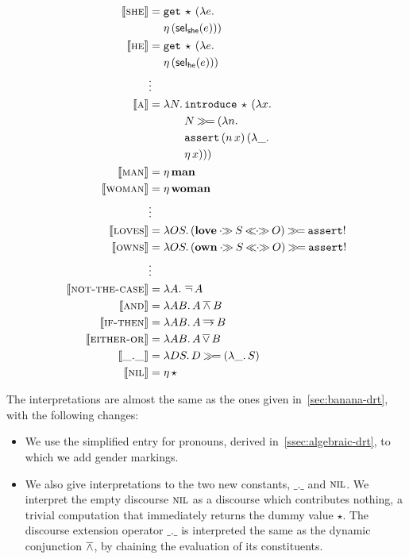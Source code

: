 \begin{align*}
  \lex{she}{\begin{aligned}[t]
      &\app{\op{get}}{\star}{(\lam{e}{ \\
      &\etaE{(\selshe(e))}})}
    \end{aligned}} \\
  \lex{he}{\begin{aligned}[t]
      &\app{\op{get}}{\star}{(\lam{e}{ \\
      &\etaE{(\selhe(e))}})}
    \end{aligned}} \\
  &\vdots \\
  \lex{a}{\begin{aligned}[t]
      \lam{N}{&\app{\op{introduce}}{\star}{(\lam{x}{ \\
              &N \hsbind (\lam {n}{ \\
              &\app{\op{assert}}{(\ap{n}{x})}{(\lam{\_}{ \\
              &\etaE{x}})}})})}}
    \end{aligned}} \\
  \lex{man}{\etaE{\obj{man}}} \\
  \lex{woman}{\etaE{\obj{woman}}} \\
  &\vdots \\
  \lex{loves}{\lam{O S}{(\obj{love} \apr S \aplr O) \hsbind \op{assert}!}} \\
  \lex{owns}{\lam{O S}{(\obj{own} \apr S \aplr O) \hsbind \op{assert}!}} \\
  &\vdots \\
  \lex{not-the-case}{\lam{A}{\dnot A}} \\
  \lex{and}{\lam{A B}{A \dand B}} \\
  \lex{if-then}{\lam{A B}{A \dimp B}} \\
  \lex{either-or}{\lam{A B}{A \dor B}} \\
  \lex{\_.\_}{\lam{D S}{D \hsbind (\lam{\_}{S})}} \\
  \lex{nil}{\etaE{\star}}
\end{align*}

The interpretations are almost the same as the ones given
in~\ref{sec:banana-drt}, with the following changes:

\begin{itemize}
\item We use the simplified entry for pronouns, derived
  in~\ref{ssec:algebraic-drt}, to which we add gender markings.
\item We also give interpretations to the two new constants, $\_.\_$ and
  $\textsc{nil}$. We interpret the empty discourse $\textsc{nil}$ as a discourse
  which contributes nothing, a trivial computation that immediately returns
  the dummy value $\star$. The discourse extension operator $\_.\_$ is
  interpreted the same as the dynamic conjunction $\mathbin{\overline{\land}}$, by chaining the
  evaluation of its constituents.
\end{itemize}

